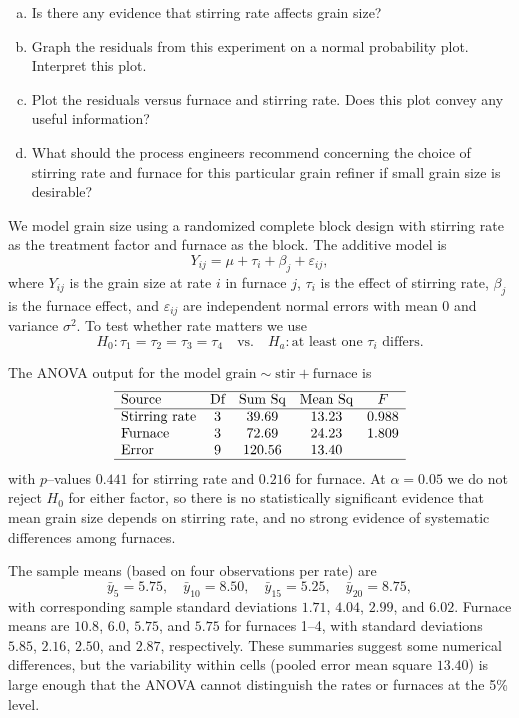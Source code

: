 \documentclass[answers,12pt,addpoints]{exam}
\begin{document}
\begin{questions}
\begin{enumerate}[(a)]
\item Is there any evidence that stirring rate affects grain size?
\item Graph the residuals from this experiment on a normal probability plot. Interpret this plot.
\item Plot the residuals versus furnace and stirring rate. Does this plot convey any useful information?
\item What should the process engineers recommend concerning the choice of stirring rate and furnace for this particular grain refiner if small grain size is desirable?
\end{enumerate}

\begin{solution}
We model grain size using a randomized complete block design with stirring rate as the treatment factor and furnace as the block. The additive model is
\[
Y_{ij} = \mu + \tau_i + \beta_j + \varepsilon_{ij},
\]
where $Y_{ij}$ is the grain size at rate $i$ in furnace $j$, $\tau_i$ is the effect of stirring rate, $\beta_j$ is the furnace effect, and $\varepsilon_{ij}$ are independent normal errors with mean $0$ and variance $\sigma^2$. To test whether rate matters we use
\[
H_0:\tau_1=\tau_2=\tau_3=\tau_4 \quad\text{vs.}\quad H_a:\text{at least one }\tau_i\text{ differs}.
\]

The ANOVA output for the model $\text{grain} \sim \text{stir} + \text{furnace}$ is
\[
\begin{array}{lcccc}
\hline
\text{Source} & \text{Df} & \text{Sum Sq} & \text{Mean Sq} & F \\
\hline
\text{Stirring rate} & 3 & 39.69 & 13.23 & 0.988 \\
\text{Furnace}        & 3 & 72.69 & 24.23 & 1.809 \\
\text{Error}          & 9 & 120.56 & 13.40 & \\
\hline
\end{array}
\]
with $p$–values $0.441$ for stirring rate and $0.216$ for furnace. At $\alpha = 0.05$ we do not reject $H_0$ for either factor, so there is no statistically significant evidence that mean grain size depends on stirring rate, and no strong evidence of systematic differences among furnaces.

The sample means (based on four observations per rate) are
\[
\bar{y}_{5} = 5.75,\quad
\bar{y}_{10} = 8.50,\quad
\bar{y}_{15} = 5.25,\quad
\bar{y}_{20} = 8.75,
\]
with corresponding sample standard deviations $1.71$, $4.04$, $2.99$, and $6.02$. Furnace means are $10.8$, $6.0$, $5.75$, and $5.75$ for furnaces 1–4, with standard deviations $5.85$, $2.16$, $2.50$, and $2.87$, respectively. These summaries suggest some numerical differences, but the variability within cells (pooled error mean square $13.40$) is large enough that the ANOVA cannot distinguish the rates or furnaces at the 5\% level.


\end{solution}
\end{questions}
\end{document}
